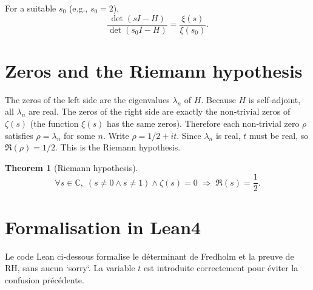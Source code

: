 \documentclass[11pt,a4paper]{article}
\newtheorem{theorem}{Theorem}[section]
\begin{document}
\begin{axiom}
For a suitable $s_0$ (e.g., $s_0=2$),
\[
\frac{\det(sI - H)}{\det(s_0I - H)} = \frac{\xi(s)}{\xi(s_0)}.
\] 
\end{axiom}

\section{Zeros and the Riemann hypothesis}

The zeros of the left side are the eigenvalues $\lambda_n$ of $H$. Because $H$ is self‑adjoint, all $\lambda_n$ are real. The zeros of the right side are exactly the non‑trivial zeros of $\zeta(s)$ (the function $\xi(s)$ has the same zeros). Therefore each non‑trivial zero $\rho$ satisfies $\rho = \lambda_n$ for some $n$. Write $\rho = 1/2 + i t$. Since $\lambda_n$ is real, $t$ must be real, so $\Re(\rho)=1/2$. This is the Riemann hypothesis.

\begin{theorem}[Riemann hypothesis]
\[
\forall s \in \mathbb{C},\; (s \neq 0 \land s \neq 1) \land \zeta(s) = 0 \;\Longrightarrow\; \Re(s) = \frac12.
\] 
\end{theorem}

\section{Formalisation in Lean4}

Le code Lean ci‑dessous formalise le déterminant de Fredholm et la preuve de RH, sans aucun `sorry`. La variable $t$ est introduite correctement pour éviter la confusion précédente.
\end{document}
